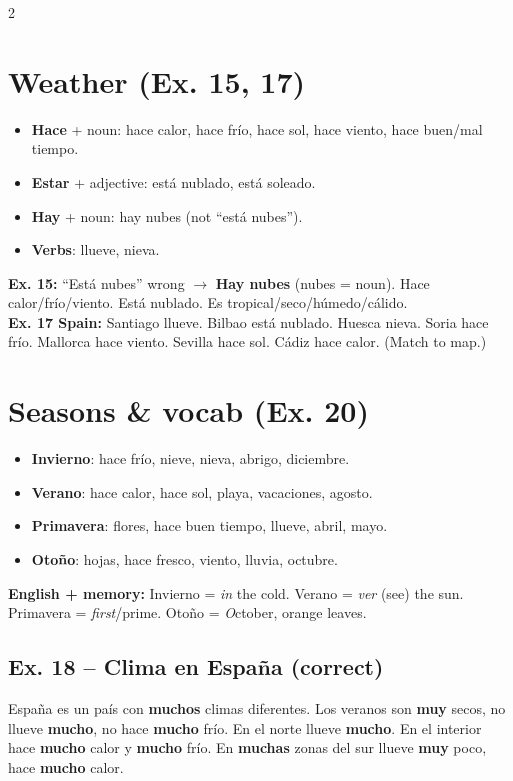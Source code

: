 \documentclass[9pt,a4paper]{article}
\begin{document}
\begin{multicols}{2}
\section*{\color{spanishgreen}Weather (Ex. 15, 17)}
\begin{itemize}
\item \textbf{Hace} + noun: hace calor, hace fr\'io, hace sol, hace viento, hace buen/mal tiempo.
\item \textbf{Estar} + adjective: est\'a nublado, est\'a soleado.
\item \textbf{Hay} + noun: hay nubes (not ``est\'a nubes'').
\item \textbf{Verbs}: llueve, nieva.
\end{itemize}
\textbf{Ex. 15:} ``Est\'a nubes'' wrong $\to$ \textbf{Hay nubes} (nubes = noun). Hace calor/fr\'io/viento. Est\'a nublado. Es tropical/seco/h\'umedo/c\'alido. \\
\textbf{Ex. 17 Spain:} Santiago llueve. Bilbao est\'a nublado. Huesca nieva. Soria hace fr\'io. Mallorca hace viento. Sevilla hace sol. C\'adiz hace calor. (Match to map.)

\section*{\color{spanishgreen}Seasons \& vocab (Ex. 20)}
\begin{itemize}
\item \textbf{Invierno}: hace fr\'io, nieve, nieva, abrigo, diciembre.
\item \textbf{Verano}: hace calor, hace sol, playa, vacaciones, agosto.
\item \textbf{Primavera}: flores, hace buen tiempo, llueve, abril, mayo.
\item \textbf{Oto\~no}: hojas, hace fresco, viento, lluvia, octubre.
\end{itemize}
\textbf{English + memory:} Invierno = \textit{in} the cold. Verano = \textit{ver} (see) the sun. Primavera = \textit{first}/prime. Oto\~no = \textit{O}ctober, orange leaves.

\subsection*{Ex. 18 -- Clima en Espa\~na (correct)}
Espa\~na es un pa\'is con \textbf{muchos} climas diferentes. Los veranos son \textbf{muy} secos, no llueve \textbf{mucho}, no hace \textbf{mucho} fr\'io. En el norte llueve \textbf{mucho}. En el interior hace \textbf{mucho} calor y \textbf{mucho} fr\'io. En \textbf{muchas} zonas del sur llueve \textbf{muy} poco, hace \textbf{mucho} calor.


\end{multicols}
\end{document}

